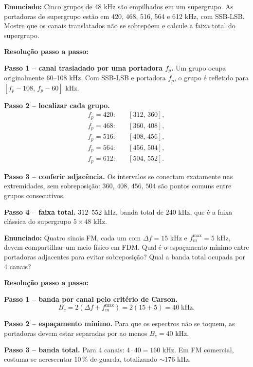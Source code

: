 \documentclass[11pt,a4paper]{article}
\begin{document}
\begin{exercicio}
\textbf{Enunciado:} Cinco grupos de 48 kHz são empilhados em um supergrupo. As portadoras de supergrupo estão em 420, 468, 516, 564 e 612 kHz, com SSB-LSB. Mostre que os canais translatados não se sobrepõem e calcule a faixa total do supergrupo.

\textbf{Resolução passo a passo:}

\textbf{Passo 1 -- canal trasladado por uma portadora $f_p$.}
Um grupo ocupa originalmente 60--108 kHz. Com SSB-LSB e portadora $f_p$, o grupo é refletido para $[f_p-108,\,f_p-60]$ kHz.

\textbf{Passo 2 -- localizar cada grupo.}
\begin{align*}
  f_p=420:&\quad [312,\,360], \\
  f_p=468:&\quad [360,\,408], \\
  f_p=516:&\quad [408,\,456], \\
  f_p=564:&\quad [456,\,504], \\
  f_p=612:&\quad [504,\,552].
\end{align*}

\textbf{Passo 3 -- conferir adjacência.}
Os intervalos se conectam exatamente nas extremidades, sem sobreposição: $360,\,408,\,456,\,504$ são pontos comuns entre grupos consecutivos.

\textbf{Passo 4 -- faixa total.}
$312$--$552$ kHz, banda total de $240$ kHz, que é a faixa clássica do supergrupo $5\times 48$ kHz.
\end{exercicio}

\begin{exercicio}
\textbf{Enunciado:} Quatro sinais FM, cada um com $\Delta f=15$ kHz e $f_m^{\max}=5$ kHz, devem compartilhar um meio físico em FDM. Qual é o espaçamento mínimo entre portadoras adjacentes para evitar sobreposição? Qual a banda total ocupada por 4 canais?

\textbf{Resolução passo a passo:}

\textbf{Passo 1 -- banda por canal pelo critério de Carson.}
\[
  B_c = 2(\Delta f + f_m^{\max}) = 2(15 + 5) = 40\;\text{kHz}.
\]

\textbf{Passo 2 -- espaçamento mínimo.}
Para que os espectros não se toquem, as portadoras devem estar separadas por ao menos $B_c=40$ kHz.

\textbf{Passo 3 -- banda total.}
Para 4 canais: $4\!\cdot\!40 = 160$ kHz. Em FM comercial, costuma-se acrescentar 10\,\% de guarda, totalizando $\sim 176$ kHz.
\end{exercicio}
\end{document}
